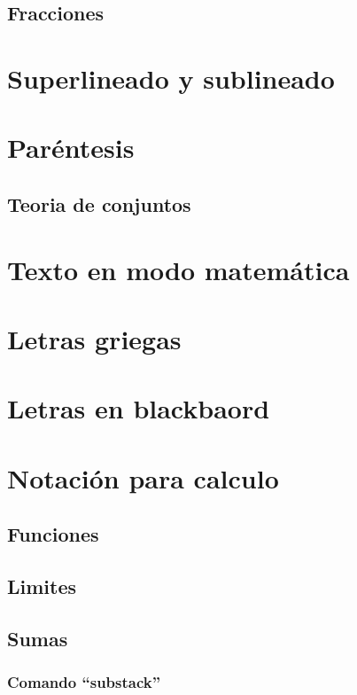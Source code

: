 \documentclass[../notes.tex]{subfiles}
\begin{document}
        \subsection{Fracciones}
        
    \section{Superlineado y sublineado}
    
    \section{Paréntesis}
    
        \subsection{Teoria de conjuntos}
        
        
    \section{Texto en modo matemática}
    
    \section{Letras griegas}
    
    \section{Letras en blackbaord}
    
    \section{Notación para calculo}
        
        \subsection{Funciones}
        \subsection{Limites}
        \subsection{Sumas}
            \subsubsection{Comando ``substack''}
\end{document}
